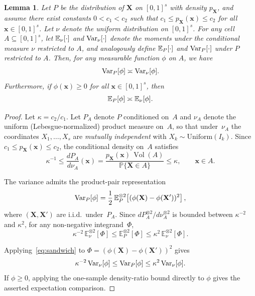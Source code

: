 \documentclass[11pt]{article}
\theoremstyle{plain}
\newtheorem{lemma}[theorem]{Lemma}
\theoremstyle{definition}
\theoremstyle{remark}
\theoremstyle{plain}
\newcommand{\bx}{\mathbf{x}}
\newcommand{\bX}{\mathbf{X}}
\DeclarePairedDelimiter{\bracks}{[}{]}
\renewcommand{\P}{\mathbb{P}}
\newcommand{\E}{\mathbb{E}}
\newcommand{\Var}{\textnormal{Var}}
\DeclareMathOperator{\Vol}{Vol}
\newcommand{\1}{\mathbbm{1}}
\begin{document}
\begin{lemma}\label{lemma:equiv-unif-P}
    Let $P$ be the distribution of $\bX$ on $[0,1]^s$ with density $p_{\bX}$, and assume there exist constants $0 < c_1 < c_2$ such that $c_1 \leq p_{\bX}(\bx) \leq c_2$ for all $\bx \in [0,1]^s$. Let $\nu$ denote the uniform distribution on $[0,1]^s$. For any cell $A \subseteq [0,1]^s$, let $\E_\nu\bracks*{\cdot}$ and $\Var_\nu\bracks*{\cdot}$ denote the moments under the conditional measure $\nu$ restricted to $A$, and analogously define $\E_P\bracks*{\cdot}$ and $\Var_P\bracks*{\cdot}$ under $P$ restricted to $A$. Then, for any measurable function $\phi$ on $A$, we have
    \begin{equation*}
         \Var_P\bracks*{\phi} \asymp \Var_\nu\bracks*{\phi}.
    \end{equation*}
    Furthermore, if $\phi(\bx) \geq 0$ for all $\bx \in [0,1]^s$, then
    \begin{equation*}
        \E_P\bracks*{\phi} \asymp \E_\nu\bracks*{\phi}.
    \end{equation*}
\end{lemma}

\begin{proof}
    Let $\kappa= c_2/c_1$. Let $P_A$ denote $P$ conditioned
    on~$A$ and $\nu_A$ denote the uniform (Lebesgue-normalized) product measure
    on~$A$, so that under~$\nu_A$ the coordinates
    $X_1, \ldots, X_s$ are \emph{mutually independent} with
    $X_k \sim \mathrm{Uniform}(I_k)$.
    Since $c_1 \leq p_{\bX}(\bx) \leq c_2$, the conditional density on~$A$
    satisfies
    \begin{equation*}
      \kappa^{-1}
      \leq \frac{dP_A}{d\nu_A}(\bx)
      = \frac{p_{\bX}(\bx)\,\Vol(A)}{\P\{\bX \in A\}}
      \leq \kappa,
      \qquad \bx \in A.
    \end{equation*}

    The variance admits the product-pair representation
    \begin{equation*}
      \Var_P[\phi] = \frac{1}{2}\,
      \E_P^{\otimes 2}\!\left[
        (\phi(\bX) - \phi(\bX'))^2
      \right],
    \end{equation*}
    where $(\bX, \bX')$ are i.i.d.\ under~$P_A$. Since
    $dP_A^{\otimes 2}/d\nu_A^{\otimes 2}$ is bounded between
    $\kappa^{-2}$ and $\kappa^2$, for any non-negative integrand~$\Phi$,
    \begin{equation}\label{eq:sandwich}
      \kappa^{-2}\,\E_\nu^{\otimes 2}[\Phi]
      \leq \E_P^{\otimes 2}[\Phi]
      \leq \kappa^2\,\E_\nu^{\otimes 2}[\Phi].
    \end{equation}

    Applying~\eqref{eq:sandwich} to
    $\Phi=(\phi(\bX)-\phi(\bX'))^2$ gives
    \begin{equation*}
      \kappa^{-2}\, \Var_\nu[\phi]
      \leq \Var_P[\phi]
      \leq \kappa^2\, \Var_\nu[\phi].
    \end{equation*}
    If $\phi\ge0$, applying the one-sample density-ratio bound directly to
    $\phi$ gives the asserted expectation comparison.
\end{proof}
\end{document}
